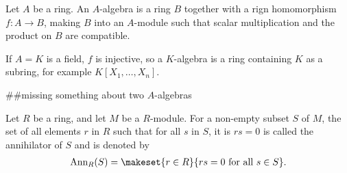 \begin{defbox}
    \begin{definition}[A-algebra]
        Let \(A\) be a ring. An \(A\)-algebra is a ring \(B\) together with a rign homomorphism \(f: A \longrightarrow B\), making \(B\) into an \(A\)-module such that scalar multiplication and the product on \(B\) are compatible.

        If \(A = K\) is a field, \(f\) is injective, so a \(K\)-algebra is a ring containing \(K\) as a subring, for example \(K[X_1, \ldots, X_n]\).

        \#\#missing something about two \(A\)-algebras
    \end{definition}
\end{defbox}

\begin{definition}[Annihilator]
    Let \(R\) be a ring, and let \(M\) be a \(R\)-module. For a non-empty subset \(S\) of \(M\), the set of all elements \(r\) in \(R\) such that for all \(s\) in \(S\), it is \(rs = 0\) is called the annihilator of \(S\) and is denoted by
    \begin{align*}
        \text{Ann}_R(S) = \makeset{r \in R}{rs = 0 \text{ for all } s \in S} \text{.}
    \end{align*}
\end{definition}

